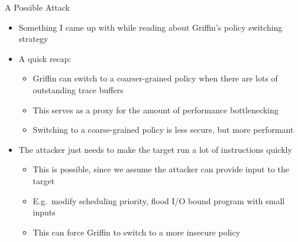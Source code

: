 \documentclass[12pt, dvipsnames, aspectratio=169]{beamer}
\begin{document}
\begin{frame}[c]{A Possible Attack}{}
  \begin{itemize}
    \item Something I came up with while reading about Griffin's policy switching strategy

    \vfill
    \item A quick recap:
    \begin{itemize}
      \item Griffin can switch to a coarser-grained policy when there are lots of\\outstanding trace buffers
      \item This serves as a proxy for the amount of performance bottlenecking
      \item Switching to a coarse-grained policy is less secure, but more performant
    \end{itemize}

    \vfill
    \item The attacker just needs to make the target run a lot of instructions quickly
    \begin{itemize}
      \item This is possible, since we assume the attacker can provide input to the target
      \item E.g.~modify scheduling priority, flood I/O bound program with small inputs
      \item This can force Griffin to switch to a more insecure policy
    \end{itemize}
  \end{itemize}
\end{frame}

%
%
%
\end{document}
